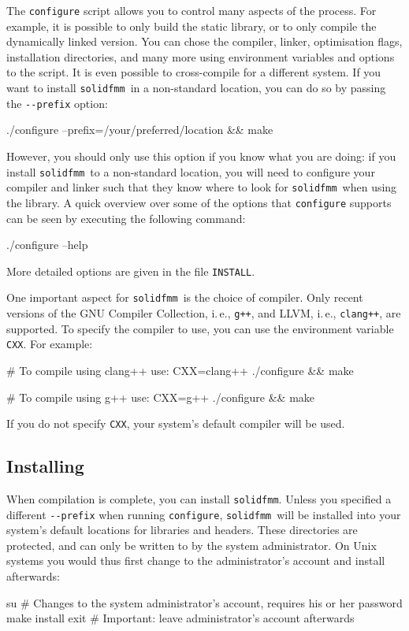 \documentclass{scrbook}
\newcommand{\solidfmm}{\texttt{solidfmm}}
\begin{document}
The \lstinline|configure| script allows you to control many aspects of the
process. For example, it is possible to only build the static library, or to
only compile the dynamically linked version. You can chose the compiler,
linker, optimisation flags, installation directories, and many more using
environment  variables and options to the script. It is even possible to
cross-compile for a different system. If you want to install \solidfmm\ in
a non-standard location, you can do so by passing the \lstinline|--prefix|
option:
\begin{commandshell*}
./configure --prefix=/your/preferred/location && make
\end{commandshell*}
However, you should only use this option if you know what you are doing: if you
install \solidfmm\ to a non-standard location, you will need to configure your
compiler and linker such that they know where to look for \solidfmm\ when using
the library. A quick overview over some of the options that
\lstinline|configure| supports can be seen by executing the following command:
\begin{commandshell*}
./configure --help
\end{commandshell*}
\noindent More detailed options are given in the file \lstinline|INSTALL|.

One important aspect for \solidfmm\ is the choice of compiler. Only recent
versions of the GNU Compiler Collection, i.\,e., \lstinline|g++|,%
\autocite{gcc} and LLVM, i.\,e., \lstinline|clang++|,\autocite{clang} are
supported. To specify the compiler to use, you can use the environment variable
\lstinline|CXX|. For example:
\begin{commandshell*}
# To compile using clang++ use:
CXX=clang++ ./configure && make

# To compile using g++ use:
CXX=g++ ./configure && make
\end{commandshell*}
\noindent If you do not specify \lstinline|CXX|, your system's default compiler
will be used.

\subsection{Installing}
When compilation is complete, you can install \solidfmm. Unless you specified
a different \lstinline|--prefix| when running \lstinline|configure|, \solidfmm\
will be installed into your system's default locations for libraries and
headers. These directories are protected, and can only be written to by the
system administrator. On Unix systems you would thus first change to the
administrator's account and install afterwards:
\begin{commandshell*}
su # Changes to the system administrator's account, requires his or her password
make install
exit # Important: leave administrator's account afterwards
\end{commandshell*}
\end{document}
